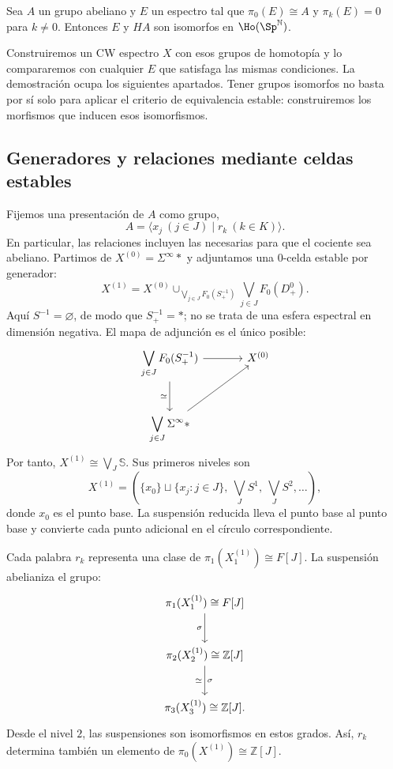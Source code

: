 \begin{prop}\label{prop:c22-unicidad-em}
Sea $A$ un grupo abeliano y $E$ un espectro tal que $\pi_0(E)\cong A$ y $\pi_k(E)=0$ para $k\ne0$. Entonces $E$ y $HA$ son isomorfos en $\Ho(\Sp^{\mathbb N})$.
\end{prop}

Construiremos un CW espectro $X$ con esos grupos de homotopía y lo compararemos con cualquier $E$ que satisfaga las mismas condiciones. La demostración ocupa los siguientes apartados. Tener grupos isomorfos no basta por sí solo para aplicar el criterio de equivalencia estable: construiremos los morfismos que inducen esos isomorfismos.

\subsection{Generadores y relaciones mediante celdas estables}
Fijemos una presentación de $A$ como grupo,
\[
A=\langle x_j\ (j\in J)\mid r_k\ (k\in K)\rangle.
\]
En particular, las relaciones incluyen las necesarias para que el cociente sea abeliano. Partimos de $X^{(0)}=\Sigma^\infty *$ y adjuntamos una $0$-celda estable por generador:
\[
X^{(1)}=X^{(0)}
\cup_{\bigvee_{j\in J}F_0(S^{-1}_+)}
\bigvee_{j\in J}F_0(D^0_+).
\]
Aquí $S^{-1}=\varnothing$, de modo que $S^{-1}_+=*$; no se trata de una esfera espectral en dimensión negativa. El mapa de adjunción es el único posible:
\[
\begin{tikzcd}[column sep=large,row sep=large]
\displaystyle\bigvee_{j\in J}F_0(S^{-1}_+)\arrow[r]\arrow[d,"\simeq"']
&X^{(0)}\\
\displaystyle\bigvee_{j\in J}\Sigma^\infty *\arrow[ur]&
\end{tikzcd}
\]
Por tanto, $X^{(1)}\cong\bigvee_J\mathbb S$. Sus primeros niveles son
\[
X^{(1)}=\left(\{x_0\}\sqcup\{x_j:j\in J\},\
\bigvee_JS^1,\ \bigvee_JS^2,\ldots\right),
\]
donde $x_0$ es el punto base. La suspensión reducida lleva el punto base al punto base y convierte cada punto adicional en el círculo correspondiente.

Cada palabra $r_k$ representa una clase de $\pi_1(X^{(1)}_1)\cong F[J]$. La suspensión abelianiza el grupo:
\[
\begin{tikzcd}[row sep=large,column sep=large]
\pi_1(X^{(1)}_1)\cong F[J]\arrow[d,"\sigma"']\\
\pi_2(X^{(1)}_2)\cong\mathbb Z[J]\arrow[d,"\sigma","\simeq"']\\
\pi_3(X^{(1)}_3)\cong\mathbb Z[J].
\end{tikzcd}
\]
Desde el nivel $2$, las suspensiones son isomorfismos en estos grados. Así, $r_k$ determina también un elemento de $\pi_0(X^{(1)})\cong\mathbb Z[J]$.

